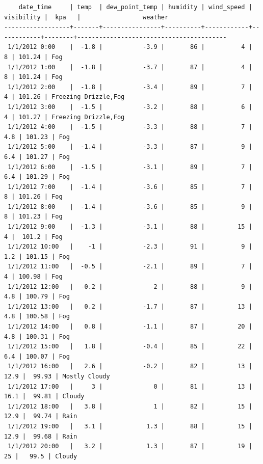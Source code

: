 \documentclass[a4paper,11pt]{article}
\newcommand{\newpagex}{
    \newpage
    \vspace*{-7\baselineskip} %
}
\begin{document}
\begin{itemize}
\begin{verbatim}
    date_time     | temp  | dew_point_temp | humidity | wind_speed | visibility |  kpa   |                 weather                 
------------------+-------+----------------+----------+------------+------------+--------+-----------------------------------------
 1/1/2012 0:00    |  -1.8 |           -3.9 |       86 |          4 |          8 | 101.24 | Fog
 1/1/2012 1:00    |  -1.8 |           -3.7 |       87 |          4 |          8 | 101.24 | Fog
 1/1/2012 2:00    |  -1.8 |           -3.4 |       89 |          7 |          4 | 101.26 | Freezing Drizzle,Fog
 1/1/2012 3:00    |  -1.5 |           -3.2 |       88 |          6 |          4 | 101.27 | Freezing Drizzle,Fog
 1/1/2012 4:00    |  -1.5 |           -3.3 |       88 |          7 |        4.8 | 101.23 | Fog
 1/1/2012 5:00    |  -1.4 |           -3.3 |       87 |          9 |        6.4 | 101.27 | Fog
 1/1/2012 6:00    |  -1.5 |           -3.1 |       89 |          7 |        6.4 | 101.29 | Fog
 1/1/2012 7:00    |  -1.4 |           -3.6 |       85 |          7 |          8 | 101.26 | Fog
 1/1/2012 8:00    |  -1.4 |           -3.6 |       85 |          9 |          8 | 101.23 | Fog
 1/1/2012 9:00    |  -1.3 |           -3.1 |       88 |         15 |          4 |  101.2 | Fog
 1/1/2012 10:00   |    -1 |           -2.3 |       91 |          9 |        1.2 | 101.15 | Fog
 1/1/2012 11:00   |  -0.5 |           -2.1 |       89 |          7 |          4 | 100.98 | Fog
 1/1/2012 12:00   |  -0.2 |             -2 |       88 |          9 |        4.8 | 100.79 | Fog
 1/1/2012 13:00   |   0.2 |           -1.7 |       87 |         13 |        4.8 | 100.58 | Fog
 1/1/2012 14:00   |   0.8 |           -1.1 |       87 |         20 |        4.8 | 100.31 | Fog
 1/1/2012 15:00   |   1.8 |           -0.4 |       85 |         22 |        6.4 | 100.07 | Fog
 1/1/2012 16:00   |   2.6 |           -0.2 |       82 |         13 |       12.9 |  99.93 | Mostly Cloudy
 1/1/2012 17:00   |     3 |              0 |       81 |         13 |       16.1 |  99.81 | Cloudy
 1/1/2012 18:00   |   3.8 |              1 |       82 |         15 |       12.9 |  99.74 | Rain
 1/1/2012 19:00   |   3.1 |            1.3 |       88 |         15 |       12.9 |  99.68 | Rain
 1/1/2012 20:00   |   3.2 |            1.3 |       87 |         19 |         25 |   99.5 | Cloudy

        \end{verbatim} 
    \end{itemize}
    

    \newpagex
    \noindent 
\end{document}
